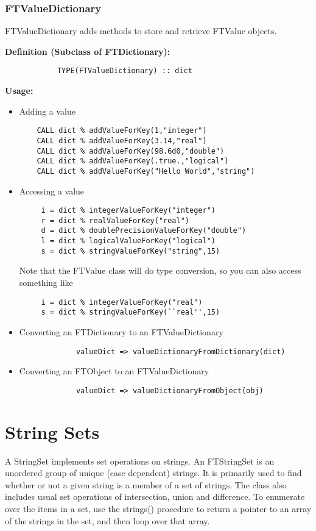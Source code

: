 \documentclass[9pt]{article}
\begin{document}
\subsubsection{FTValueDictionary}
FTValueDictionary adds methods to store and retrieve FTValue objects.

     {\bf Definition (Subclass of FTDictionary):}
	{\color{blue}\begin{verbatim}
        	TYPE(FTValueDictionary) :: dict
	\end{verbatim}}
     {\bf Usage:}
\begin{itemize}
\item Adding a value
	{\color{blue}\begin{verbatim}
    CALL dict % addValueForKey(1,"integer")
    CALL dict % addValueForKey(3.14,"real")
    CALL dict % addValueForKey(98.6d0,"double")
    CALL dict % addValueForKey(.true.,"logical")
    CALL dict % addValueForKey("Hello World","string")
	\end{verbatim}}
	
\item Accessing a value
	{\color{blue}\begin{verbatim}
     i = dict % integerValueForKey("integer")
     r = dict % realValueForKey("real")
     d = dict % doublePrecisionValueForKey("double")
     l = dict % logicalValueForKey("logical")
     s = dict % stringValueForKey("string",15)
	\end{verbatim}}
	
	Note that the FTValue class will do type conversion, so you can also access something like
	{\color{blue}\begin{verbatim}
     i = dict % integerValueForKey("real")
     s = dict % stringValueForKey(``real'',15)
	\end{verbatim}}
\item Converting an FTDictionary to an FTValueDictionary
	{\color{blue}\begin{verbatim}
        	 valueDict => valueDictionaryFromDictionary(dict)
	\end{verbatim}}
\item Converting an FTObject to an FTValueDictionary
	{\color{blue}\begin{verbatim}
        	 valueDict => valueDictionaryFromObject(obj)
	\end{verbatim}}

\end{itemize}
\section{String Sets}
A StringSet implements set operations on strings. An FTStringSet is an unordered group of unique (case dependent) strings. It is
primarily used to find whether or not a given string is a member of a set of strings. The class also includes usual
set operations of intersection, union and difference. To enumerate over the items in a set, use the strings() procedure
to return a pointer to an array of the strings in the set, and then loop over that array. 
\end{document}
